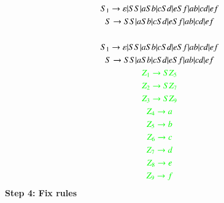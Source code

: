 \documentclass[12pt,letterpaper]{article}
\begin{document}
		\begin{gather*}
			S_1\rightarrow \varepsilon\arrowvert SS\arrowvert aSb\arrowvert cSd\arrowvert eSf\arrowvert ab\arrowvert cd\arrowvert ef\\
			S \rightarrow SS\arrowvert aSb\arrowvert cSd\arrowvert eSf\arrowvert ab\arrowvert cd\arrowvert ef\\
			\\S_1\rightarrow \varepsilon\arrowvert SS\arrowvert aSb\arrowvert cSd\arrowvert eSf\arrowvert ab\arrowvert cd\arrowvert ef\\
			S \rightarrow SS\arrowvert aSb\arrowvert cSd\arrowvert eSf\arrowvert ab\arrowvert cd\arrowvert ef\\
			\textcolor{green}{Z_1\rightarrow SZ_5}\\
			\textcolor{green}{Z_2\rightarrow SZ_7}\\
			\textcolor{green}{Z_3\rightarrow SZ_9}\\
			\textcolor{green}{Z_4\rightarrow a}\\
			\textcolor{green}{Z_5\rightarrow b}\\
			\textcolor{green}{Z_6\rightarrow c}\\
			\textcolor{green}{Z_7\rightarrow d}\\
			\textcolor{green}{Z_8\rightarrow e}\\
			\textcolor{green}{Z_9\rightarrow f}\\
		\end{gather*}
		\textbf{Step 4: Fix rules}
\end{document}
